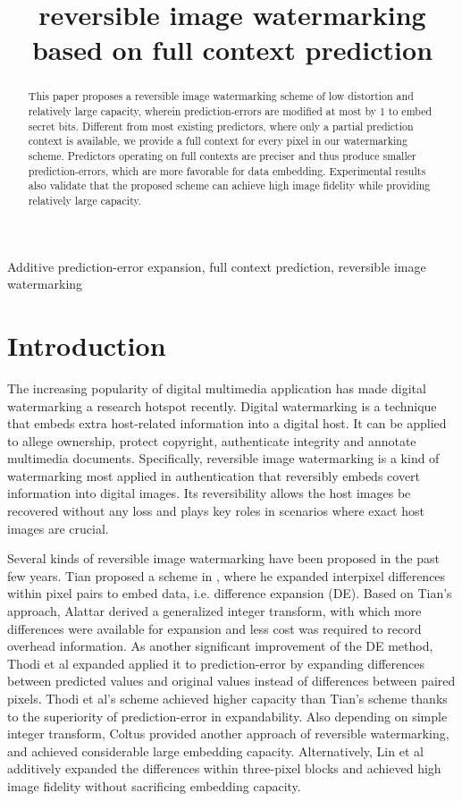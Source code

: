 \documentclass{article}
\title{reversible image watermarking based on full context prediction}
\begin{document}
\maketitle
\begin{abstract}

This paper proposes a reversible image watermarking scheme of low distortion and relatively large
capacity, wherein prediction-errors are modified at most by 1 to embed secret bits.  Different from
most existing predictors, where only a partial prediction context is available, we provide a full
context for every pixel in our watermarking scheme. Predictors operating on full contexts are
preciser and thus produce smaller prediction-errors, which are more favorable for data embedding.
Experimental results also validate that the proposed scheme can achieve high image fidelity while
providing relatively large capacity.

\end{abstract}

\begin{keywords}
Additive prediction-error expansion, full context prediction, reversible image watermarking
\end{keywords}

\section{Introduction} \label{sec:intro}
The increasing popularity of digital multimedia application has made digital watermarking a research
hotspot recently. Digital watermarking is a technique that embeds extra host-related information
into a digital host. It can be applied to allege ownership, protect copyright, authenticate
integrity and annotate multimedia documents. Specifically, reversible image watermarking is a kind
of watermarking most applied in authentication that reversibly embeds covert information into
digital images. Its reversibility allows the host images be recovered without any loss and plays key
roles in scenarios where exact host images are crucial.  

Several kinds of reversible image watermarking have been proposed in the past few years. Tian
proposed a scheme in \cite{Tian03de}, where he expanded interpixel differences within pixel pairs to
embed data, i.e. difference expansion (DE). Based on Tian's approach, Alattar \cite{Alattar04deip}
derived a generalized integer transform, with which more differences were available for expansion
and less cost was required to record overhead information.  As another significant improvement of
the DE method, Thodi et al \cite{Thodi07pee} expanded applied it to prediction-error by expanding
differences between predicted values and original values instead of differences between paired
pixels. Thodi et al's scheme achieved higher capacity than Tian's scheme thanks to the superiority of
prediction-error in expandability. Also depending on simple integer transform, Coltus
\cite{Coltuc2007a} provided another approach of reversible watermarking, and achieved considerable
large embedding capacity. Alternatively, Lin et al \cite{Lin08tp} additively expanded the
differences within three-pixel blocks and achieved high image fidelity without sacrificing embedding
capacity.
\end{document}
